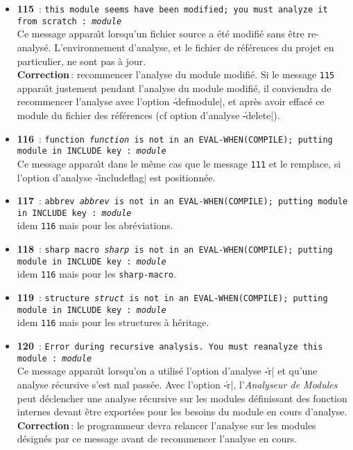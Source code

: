 \begin{itemize}
\item {\Large {\bf 115}}\ : {\tt this module seems have been modified; you
must analyze it from scratch : {\em module}}\\
Ce message appara\^{\i}t lorsqu'un fichier source a \'{e}t\'{e} modifi\'{e}
sans \^{e}tre re-analys\'{e}. L'environnement d'analyse, et le fichier de
r\'{e}f\'{e}rences du projet en particulier, ne sont pas \`{a} jour. \\
{\bf Correction}\,: recommencer l'analyse du module modifi\'{e}. Si le
message {\tt 115} appara\^{\i}t justement pendant l'analyse du module
modifi\'{e}, il conviendra de recommencer l'analyse avec l'option
\|-defmodule|, et apr\`{e}s avoir effac\'{e} ce module du fichier des
r\'{e}f\'{e}rences (cf option d'analyse \|-delete|).

\item {\Large {\bf 116}}\ : {\tt function {\em function} is not in an
EVAL-WHEN(COMPILE); putting module in INCLUDE key : {\em module}}\\
Ce message appara\^{\i}t dans le m\^{e}me cas que le message {\tt 111} et le
remplace, si l'option
d'analyse \|-includeflag| est positionn\'{e}e.

\item {\Large {\bf 117}}\ : {\tt abbrev {\em abbrev} is not in an
EVAL-WHEN(COMPILE); putting module in INCLUDE key : {\em module}}\\
idem {\tt 116} mais pour les abr\'{e}viations.

\item {\Large {\bf 118}}\ : {\tt sharp macro {\em sharp} is not in an
EVAL-WHEN(COMPILE); putting module in INCLUDE key : {\em module}}\\
idem {\tt 116} mais pour les {\tt sharp-macro}.

\item {\Large {\bf 119}}\ : {\tt structure {\em struct} is not in an
EVAL-WHEN(COMPILE); putting module in INCLUDE key : {\em module}}\\
idem {\tt 116} mais pour les structures \`{a} h\'{e}ritage.

\item {\Large {\bf 120}}\ : {\tt Error during recursive analysis. You must
reanalyze this module : {\em module}}\\
Ce message appara\^{\i}t lorsqu'on a utilis\'{e} l'option d'analyse \|-r| et
qu'une analyse r\'{e}cursive s'est mal pass\'{e}e. 
Avec l'option \|-r|, l'{\em Analyseur de Modules} peut d\'{e}clencher une
analyse r\'{e}cursive sur les 
modules d\'{e}finissant des fonction internes devant \^{e}tre export\'{e}es
pour les besoins du module en cours d'analyse. \\
{\bf Correction}\,: le programmeur devra relancer l'analyse sur les
modules d\'{e}sign\'{e}s par ce message avant de recommencer l'analyse en
cours.


\end{itemize}
